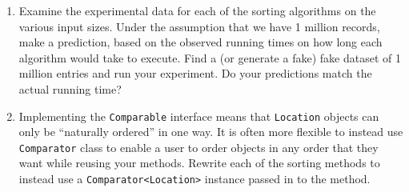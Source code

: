 \documentclass[12pt]{scrartcl}
\begin{document}
\begin{enumerate}
  \item Examine the experimental data for each of the sorting algorithms 
    on the various input sizes.  Under the assumption that we have 1 
    million records, make a prediction, based on the observed running 
    times on how long each algorithm would take to execute.  Find a (or 
    generate a fake) fake dataset of 1 million entries and run your 
    experiment.  Do your predictions match the actual running time?
  \item Implementing the \texttt{Comparable} interface means 
    that \texttt{Location} objects can only be ``naturally 
    ordered'' in one way.  It is often more flexible to instead use 
    \texttt{Comparator} class to enable a user to order objects 
    in any order that they want while reusing your methods.  Rewrite 
    each of the sorting methods to instead use a 
    \texttt{Comparator<Location>} instance passed in to the 
    method. 
\end{enumerate}
\end{document}
